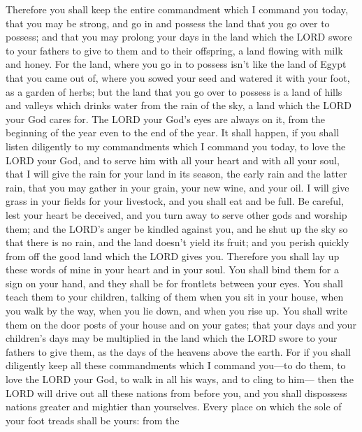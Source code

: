  Therefore you shall keep the entire commandment which I
command you today, that you may be strong, and go in and possess the
land that you go over to possess;  and that you may prolong
your days in the land which the LORD swore to your fathers to give to
them and to their offspring, a land flowing with milk and honey.
 For the land, where you go in to possess isn't like the
land of Egypt that you came out of, where you sowed your seed and
watered it with your foot, as a garden of herbs;  but the
land that you go over to possess is a land of hills and valleys which
drinks water from the rain of the sky,  a land which the
LORD your God cares for. The LORD your God's eyes are always on it, from
the beginning of the year even to the end of the year.  It
shall happen, if you shall listen diligently to my commandments which I
command you today, to love the LORD your God, and to serve him with all
your heart and with all your soul,  that I will give the
rain for your land in its season, the early rain and the latter rain,
that you may gather in your grain, your new wine, and your oil.
 I will give grass in your fields for your livestock, and
you shall eat and be full.  Be careful, lest your heart be
deceived, and you turn away to serve other gods and worship them;
 and the LORD's anger be kindled against you, and he shut
up the sky so that there is no rain, and the land doesn't yield its
fruit; and you perish quickly from off the good land which the LORD
gives you.  Therefore you shall lay up these words of mine
in your heart and in your soul. You shall bind them for a sign on your
hand, and they shall be for frontlets between your eyes. 
You shall teach them to your children, talking of them when you sit in
your house, when you walk by the way, when you lie down, and when you
rise up.  You shall write them on the door posts of your
house and on your gates;  that your days and your
children's days may be multiplied in the land which the LORD swore to
your fathers to give them, as the days of the heavens above the earth.
 For if you shall diligently keep all these commandments
which I command you---to do them, to love the LORD your God, to walk in
all his ways, and to cling to him---  then the LORD will
drive out all these nations from before you, and you shall dispossess
nations greater and mightier than yourselves.  Every place
on which the sole of your foot treads shall be yours: from the
